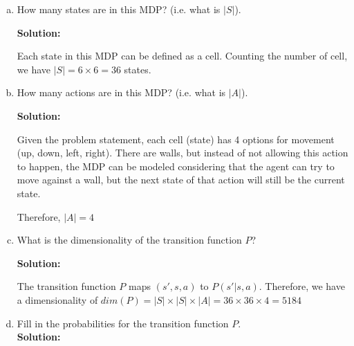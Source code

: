 \documentclass[12pt]{article}
\begin{document}
\begin{enumerate}[a)]
\item  How many states are in this MDP? (i.e. what is $|S|$).

\textbf{Solution:}

Each state in this MDP can be defined as a cell. Counting the number of cell, we have $|S|=6\times6=36$ states.


\item How many actions are in this MDP? (i.e. what is $|A|$).

\textbf{Solution:}

Given the problem statement, each cell (state) has 4 options for movement (up, down, left, right).
There are walls, but instead of not allowing this action to happen, the MDP can be modeled considering that the agent can try to move against a wall, but the next state of that action will still be the current state.

Therefore, $|A|=4$




\item What is the dimensionality of the transition function $P$?

\textbf{Solution:}

The transition function $P$ maps $(s',s,a)$ to $P(s'|s,a)$. Therefore, we have a dimensionality of $dim(P)=|S|\times|S|\times|A|=36\times36\times4=5184$


\item Fill in the probabilities for the transition function $P$.\\

\textbf{Solution:}


\end{enumerate}
\end{document}
